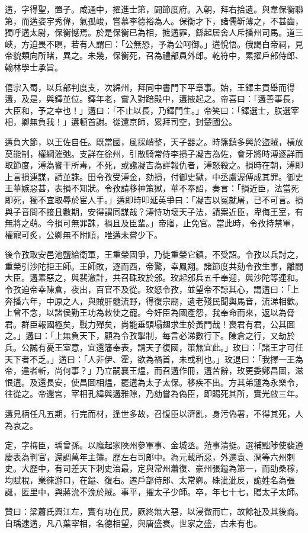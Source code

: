 \begin{pinyinscope}
 遘，字得聖，置子。咸通中，擢進士第，闢節度府。入朝，拜右拾遺。與韋保衡聯第，而遘姿宇秀偉，氣孤峻，嘗慕李德裕為人。保衡才下，諸儒靳薄之，不甚齒，獨呼遘太尉，保衡憾焉。於是保衡已為相，摭遘罪，繇起居舍人斥播州司馬。道三峽，方迫畏不瞑，若有人謂曰：「公無恐，予為公呵御。」遘悅悟。俄謁白帝祠，見帝貌類向所睹，異之。未幾，保衡死，召為禮部員外郎。乾符中，累擢戶部侍郎、翰林學士承旨。



 僖宗入蜀，以兵部判度支，次綿州，拜同中書門下平章事。始，王鐸主貢舉而得遘，及是，與鐸並位。鐸年老，嘗入對踣殿中，遘掖起之。帝喜曰：「遘善事長，大臣和，予之幸也！」遘曰：「不止以長，乃鐸門生。」帝笑曰：「鐸選士，朕選宰相，卿無負我！」遘頓首謝。從還京師，累拜司空，封楚國公。



 遘負大節，以王佐自任。既當國，風採峭整，天子器之。時籓鎮多興於盜賊，橫放莫能制，權綱漼弛。支詳在徐州，引散騎常侍李損子凝吉為佐，會牙將時溥逐詳而取節度，溥為饔干所毒，不死，或讒凝吉為詳報仇者，溥怒殺之。損時在朝，溥即上言損連謀，請並誅。田令孜受溥金，劾損，付御史獄，中丞盧渥傅成其罪。御史王華嫉惡甚，表損不知狀。令孜請移神策獄，華不奉詔，奏言：「損近臣，法當死即死，獨不宜取辱於宦人手。」遘即時叩延英爭曰：「凝吉以冤就屠，已不可言。損與子音問不接且數期，安得謂同謀哉？溥恃功壞天子法，請案近臣，卑侮王室，有無將之萌。今損可無罪誅，禍且及臣輩。」帝寤，止免官。當此時，令孜持禁軍，權寵可炙，公卿無不附順，唯遘未嘗少下。



 後令孜取安邑池鹽給衛軍，王重榮固爭，乃徙重榮它鎮，不受詔。令孜以兵討之，重榮引沙陀拒王師。王師敗，逐而西，帝驚，幸鳳翔。諸節度共劾令孜生事，離間大臣。遘素惡之，與裴澈計，共召硃玫於邠。玫起邠兵五千奉迎，與沙陀等連和。令孜迫帝幸陳倉，夜出，百官不及從。玫怒令孜，並望帝不諒其心，謂遘曰：「上奔播六年，中原之人，與賊肝髓流野，得復宗廟，遺老殘民聞輿馬音，流涕相歡。上曾不念，以諸侯勤王功為敕使之寵。今奸臣為國產怨，我奉命而來，返以為脅君。群臣報國極矣，戰力殫矣，尚能垂頭塌翅求生於黃門哉！喪君有君，公其圖之。」遘曰：「上無負天下，顧為令孜掣制，每言必涕數行下。陳倉之行，又劫於兵。公誠有憂王室意，宜還籓奉表，請天子復國，策無宜此。」玫曰：「諸王才可任天下者不乏。」遘曰：「人非伊、霍，欲為禍首，未或利也。」玫退曰：「我擇一王為帝，違者斬，尚何事？」乃立嗣襄王煴，而召遘作冊，遘苦辭，玫更委鄭昌圖，滋恨遘。及還長安，使昌圖相煴，罷遘為太子太保。移疾不出。方其弟蘧為永樂令，往從之。帝還宮，宰相孔緯與遘雅隙，乃劾嘗為偽臣，即賜死其所，實光啟三年。



 遘見柄任凡五期，行完而材，逢世多故，召愎臣以濟亂，身污偽署，不得其死，人為哀之。



 定，字梅臣，瑀曾孫。以廕起家陜州參軍事、金城丞。蒞事清挺。選補黜陟使裴遵慶表為判官，還調萬年主簿。歷左右司郎中。為元載所惡，外遷袁、潤等六州刺史。大歷中，有司差天下刺史治最，定與常州蕭復、豪州張鎰為第一，而劭桑稼，均賦稅，業徠游口，在鎰、復右。遷戶部侍郎、太常卿。硃泚泚反，詭姓名為張誕，匿里中，與蔣沇不浼於賊。事平，擢太子少師。卒，年七十七，贈太子太師。



 贊曰：梁蕭氏興江左，實有功在民，厥終無大惡，以浸微而亡，故餘祉及其後裔。自瑀逮遘，凡八葉宰相，名德相望，與唐盛衰。世家之盛，古未有也。



\end{pinyinscope}